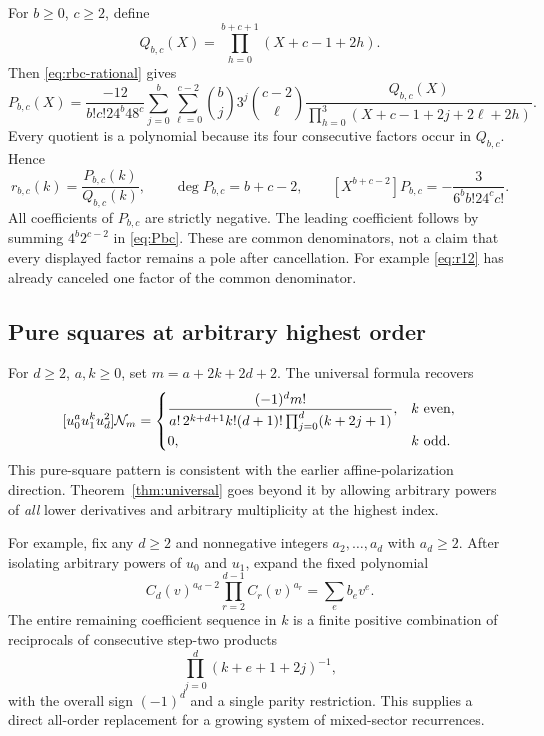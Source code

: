 \documentclass[11pt,letterpaper]{article}
\numberwithin{equation}{section}
\theoremstyle{plain}
\theoremstyle{definition}
\theoremstyle{remark}
\begin{document}
For $b\ge0$, $c\ge2$, define
\[
 Q_{b,c}(X)=\prod_{h=0}^{b+c+1}(X+c-1+2h).
\]
Then \eqref{eq:rbc-rational} gives
\begin{equation}\label{eq:Pbc}
 P_{b,c}(X)=\frac{-12}{b!c!24^b48^c}
 \sum_{j=0}^{b}\sum_{\ell=0}^{c-2}\binom bj3^j\binom{c-2}{\ell}
 \frac{Q_{b,c}(X)}{\prod_{h=0}^{3}(X+c-1+2j+2\ell+2h)}.
\end{equation}
Every quotient is a polynomial because its four consecutive factors occur in $Q_{b,c}$. Hence
\begin{equation}\label{eq:mixed-numerator}
 r_{b,c}(k)=\frac{P_{b,c}(k)}{Q_{b,c}(k)},\qquad
 \deg P_{b,c}=b+c-2,
 \qquad
 [X^{b+c-2}]P_{b,c}=-\frac3{6^b b!24^c c!}.
\end{equation}
All coefficients of $P_{b,c}$ are strictly negative. The leading coefficient follows by summing $4^b2^{c-2}$ in \eqref{eq:Pbc}. These are common denominators, not a claim that every displayed factor remains a pole after cancellation. For example \eqref{eq:r12} has already canceled one factor of the common denominator.

\subsection{Pure squares at arbitrary highest order}

For $d\ge2$, $a,k\ge0$, set $m=a+2k+2d+2$. The universal formula recovers
\begin{equation}\label{eq:all-square}
 [u_0^au_1^ku_d^2]\mathcal N_m
 =\begin{cases}
 \displaystyle\frac{(-1)^dm!}
 {a!\,2^{k+d+1}k!(d+1)!\prod_{j=0}^d(k+2j+1)},& k\text{ even},\\[5pt]
 0,&k\text{ odd}.
 \end{cases}
\end{equation}
This pure-square pattern is consistent with the earlier affine-polarization direction. Theorem~\ref{thm:universal} goes beyond it by allowing arbitrary powers of \emph{all} lower derivatives and arbitrary multiplicity at the highest index.

For example, fix any $d\ge2$ and nonnegative integers $a_2,\ldots,a_d$ with $a_d\ge2$. After isolating arbitrary powers of $u_0$ and $u_1$, expand the fixed polynomial
\[
 C_d(v)^{a_d-2}\prod_{r=2}^{d-1}C_r(v)^{a_r}=
 \sum_e b_e v^e.
\]
The entire remaining coefficient sequence in $k$ is a finite positive combination of reciprocals of consecutive step-two products
\[
 \prod_{j=0}^d(k+e+1+2j)^{-1},
\]
with the overall sign $(-1)^d$ and a single parity restriction. This supplies a direct all-order replacement for a growing system of mixed-sector recurrences.
\end{document}
